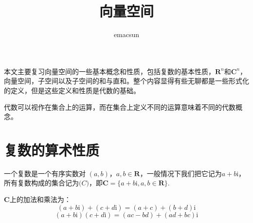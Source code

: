 \documentclass[10pt,a4paper,UTF8]{article}
\author{emacsun}
\date{}
\title{向量空间}
\begin{document}
\maketitle
\tableofcontents
{}
\newpage

本文主要复习向量空间的一些基本概念和性质，包括复数的基本性质，\(\mathbf{R}^{n}\)和\(\mathbf{C}^{n}\)，向量空间，子空间以及子空间的和与直和。整个内容显得有些无聊都是一些形式化的定义，但是这些定义和性质是代数的基础。

代数可以视作在集合上的运算，而在集合上定义不同的运算意味着不同的代数概念。


\section{复数的算术性质}
\label{sec:orgheadline1}


\begin{definition}
一个复数是一个有序实数对 \((a,b)\)，\(a,b\in \mathbf{R}\)，一般情况下我们把它记为\(a+b\mathrm{i}\)，所有复数构成的集合记为\(\mathbf(C)\)，即\(\mathbf{C}=\{a+b\mathrm{i},a,b\in \mathbf{R}\}\).

\(\mathbf{C}\)上的加法和乘法为：\[(a+b\mathrm{i}) + (c+d\mathrm{i}) = (a+c) + (b+d)\mathrm{i}\]\[(a+b\mathrm{i})(c+d\mathrm{i}) = (ac-bd) + (ad + bc)\mathrm{i}\]
\end{definition}
\end{document}
